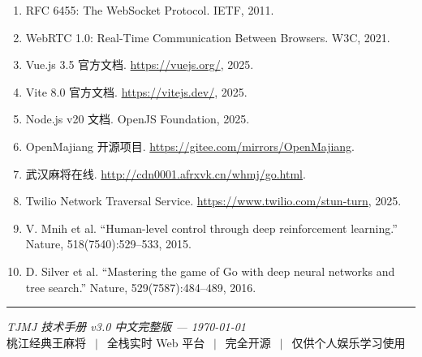 \documentclass[11pt,a4paper]{article}
\begin{document}
\begin{enumerate}[nosep]
  \item RFC 6455: The WebSocket Protocol. IETF, 2011.
  \item WebRTC 1.0: Real-Time Communication Between Browsers. W3C, 2021.
  \item Vue.js 3.5 官方文档. \url{https://vuejs.org/}, 2025.
  \item Vite 8.0 官方文档. \url{https://vitejs.dev/}, 2025.
  \item Node.js v20 文档. OpenJS Foundation, 2025.
  \item OpenMajiang 开源项目. \url{https://gitee.com/mirrors/OpenMajiang}.
  \item 武汉麻将在线. \url{http://cdn0001.afrxvk.cn/whmj/go.html}.
  \item Twilio Network Traversal Service. \url{https://www.twilio.com/stun-turn}, 2025.
  \item V. Mnih et al. ``Human-level control through deep reinforcement learning.'' Nature, 518(7540):529--533, 2015.
  \item D. Silver et al. ``Mastering the game of Go with deep neural networks and tree search.'' Nature, 529(7587):484--489, 2016.
\end{enumerate}

\vfill
\begin{center}
\rule{\linewidth}{0.4pt}
{\small\textit{TJMJ 技术手册 v3.0 中文完整版 — \today}}\\[2pt]
{\tiny 桃江经典王麻将 $\,\mid\,$ 全栈实时 Web 平台 $\,\mid\,$ 完全开源 $\,\mid\,$ 仅供个人娱乐学习使用}
\end{center}
\end{document}
